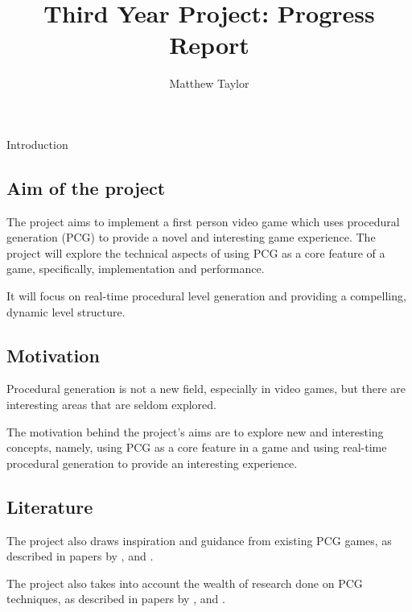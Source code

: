 \documentclass[progress]{cmpreport}
\title{Third Year Project: Progress Report}
\author{Matthew Taylor}
\begin{document}
\maketitle

\begin{section}{Introduction}

\subsection{Aim of the project}
The project aims to implement a first person video game which uses procedural generation (PCG) to provide a novel and interesting game experience. The project will explore the technical aspects of using PCG as a core feature of a game, specifically, implementation and performance. 

It will focus on real-time procedural level generation and providing a compelling, dynamic level structure.

\subsection{Motivation}
Procedural generation is not a new field, especially in video games, but there are interesting areas that are seldom explored.

The motivation behind the project's aims are to explore new and interesting concepts, namely, using PCG as a core feature in a game and using real-time procedural generation to provide an interesting experience.

\subsection{Literature}
The project also draws inspiration and guidance from existing PCG games, as described in papers by \citet{spufford_2003}, \cite{welsh_2016} and \cite{gct-spelunky}.

The project also takes into account the wealth of research done on PCG techniques, as described in papers by \cite{Perlin:1985:IS:325165.325247}, \cite{ebert2003texturing} and \cite{Dormans:2010:ALD:1814256.1814257}.
   
\end{section}
\end{document}
